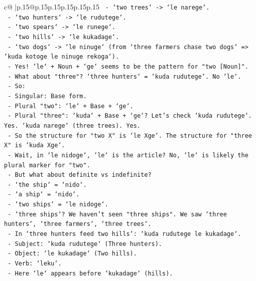 \documentclass{article}
\begin{document}
{\begin{supertabular}{c@{$\;$}|p{.15\linewidth}@{}p{.15\linewidth}p{.15\linewidth}p{.15\linewidth}p{.15\linewidth}p{.15\linewidth}}
{{{\texttt{       {-} `two trees` {-}> `le narege`.} \\
\texttt{       {-} `two hunters` {-}> `le rudutege`.} \\
\texttt{       {-} `two spears` {-}> `le runege`.} \\
\texttt{       {-} `two hills` {-}> `le kukadage`.} \\
\texttt{       {-} `two dogs` {-}> `le ninuge` (from `three farmers chase two dogs` => `kuda kotoge le ninuge rekoga`).} \\
\texttt{       {-} Yes! `le` + Noun + `ge` seems to be the pattern for "two {[}Noun{]}".} \\
\texttt{       {-} What about "three"? `three hunters` = `kuda rudutege`. No `le`.} \\
\texttt{       {-} So:} \\
\texttt{         {-} Singular: Base form.} \\
\texttt{         {-} Plural "two": `le` + Base + `ge`.} \\
\texttt{         {-} Plural "three": `kuda` + Base + `ge`? Let's check `kuda rudutege`. Yes. `kuda narege` (three trees). Yes.} \\
\texttt{         {-} So the structure for "two X" is `le Xge`. The structure for "three X" is `kuda Xge`.} \\
\texttt{         {-} Wait, in `le nidoge`, `le` is the article? No, `le` is likely the plural marker for "two".} \\
\texttt{         {-} But what about definite vs indefinite?} \\
\texttt{           {-} `the ship` = `nido`.} \\
\texttt{           {-} `a ship` = `nido`.} \\
\texttt{           {-} `two ships` = `le nidoge`.} \\
\texttt{           {-} `three ships`? We haven't seen "three ships". We saw `three hunters`, `three farmers`, `three trees`.} \\
\texttt{           {-} In `three hunters feed two hills`: `kuda rudutege le kukadage`.} \\
\texttt{             {-} Subject: `kuda rudutege` (Three hunters).} \\
\texttt{             {-} Object: `le kukadage` (Two hills).} \\
\texttt{             {-} Verb: `leku`.} \\
\texttt{             {-} Here `le` appears before `kukadage` (hills).} \\
}}}
\end{supertabular}}
\end{document}
